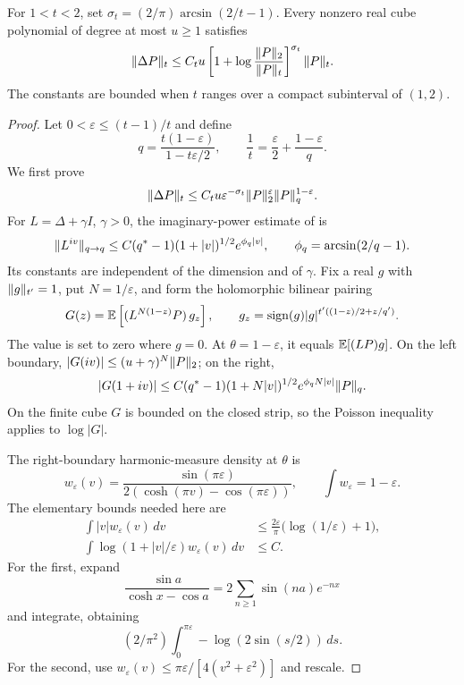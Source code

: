 \begin{theorem}\label{ac:thm:log}
For $1<t<2$, set $\sigma_t=(2/\pi)\arcsin(2/t-1)$. Every nonzero real cube polynomial of degree at most $u\ge1$ satisfies
\begin{equation}\label{ac:eq:logbern}
 \lVert \Delta P\rVert_{t}\le C_t u
 \left[1+\log\frac{\lVert P\rVert_{2}}{\lVert P\rVert_{t}}\right]^{\sigma_t}\lVert P\rVert_{t}.
\end{equation}
The constants are bounded when $t$ ranges over a compact subinterval of $(1,2)$.
\end{theorem}
\begin{proof}
Let $0<\varepsilon\le(t-1)/t$ and define
\[
 q=\frac{t(1-\varepsilon)}{1-t\varepsilon/2},\qquad
 \frac1t=\frac\varepsilon2+\frac{1-\varepsilon}{q}.
\]
We first prove
\begin{equation}\label{ac:eq:mixed}
 \lVert \Delta P\rVert_{t}\le C_tu\varepsilon^{-\sigma_t}
 \lVert P\rVert_{2}^\varepsilon\lVert P\rVert_{q}^{1-\varepsilon}.
\end{equation}
For $L=\Delta+\gamma I$, $\gamma>0$, the imaginary-power estimate of \cite[Proposition 11]{CD} is
\[
 \lVert L^{iv}\rVert_{q\to q}\le C(q^*-1)(1+|v|)^{1/2}
 e^{\phi_q|v|},\qquad \phi_q=\arcsin(2/q-1).
\]
Its constants are independent of the dimension and of $\gamma$. Fix a real $g$ with $\lVert g\rVert_{t'}=1$, put $N=1/\varepsilon$, and form the holomorphic bilinear pairing
\[
 G(z)=\mathbb E\left[(L^{N(1-z)}P)\,g_z\right],\qquad
 g_z=\operatorname{sign}(g)|g|^{t'((1-z)/2+z/q')}.
\]
The value is set to zero where $g=0$. At $\theta=1-\varepsilon$, it equals $\mathbb E[(LP)g]$. On the left boundary,
$|G(iv)|\le(u+\gamma)^N\lVert P\rVert_{2}$; on the right,
\[
 |G(1+iv)|\le C(q^*-1)(1+N|v|)^{1/2}
 e^{\phi_qN|v|}\lVert P\rVert_{q}.
\]
On the finite cube $G$ is bounded on the closed strip, so the Poisson inequality applies to $\log|G|$.

The right-boundary harmonic-measure density at $\theta$ is
\[
 w_\varepsilon(v)=\frac{\sin(\pi\varepsilon)}{2(\cosh(\pi v)-\cos(\pi\varepsilon))},
 \qquad \int w_\varepsilon=1-\varepsilon.
\]
The elementary bounds needed here are
\begin{align*}
 \int |v|w_\varepsilon(v)\,dv
 &\le\frac{2\varepsilon}{\pi}\bigl(\log(1/\varepsilon)+1\bigr),\\
 \int\log(1+|v|/\varepsilon)w_\varepsilon(v)\,dv&\le C.
\end{align*}
For the first, expand
\[\frac{\sin a}{\cosh x-\cos a}=2\sum_{n\ge1}\sin(na)e^{-nx}\]
and integrate, obtaining
\[(2/\pi^2)\int_0^{\pi\varepsilon}-\log(2\sin(s/2))\,ds.\]
For the second, use $w_\varepsilon(v)\le\pi\varepsilon/[4(v^2+\varepsilon^2)]$ and rescale.


\end{proof}
